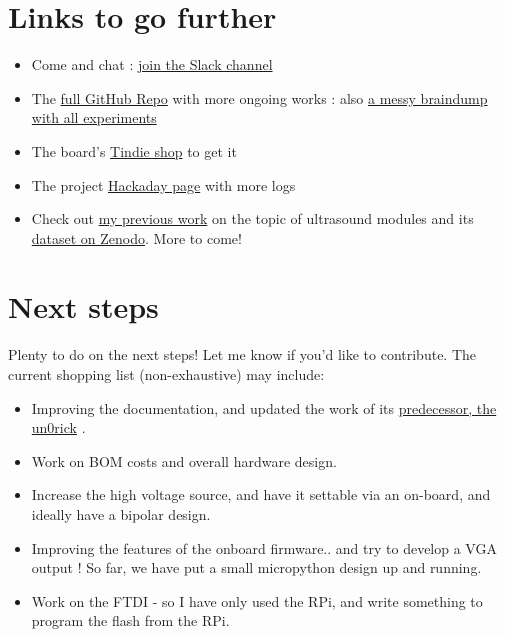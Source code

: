 \documentclass{article}
\begin{document}
\section{Links to go further}

\begin{itemize}
\item Come and chat : \href{https://join.slack.com/usdevkit/shared_invite/MTkxODU5MjU0NjI1LTE0OTY1ODgxMDEtMmYyZTliZDBlZA}{join the Slack channel} 
\item The \href{https://github.com/kelu124/lit3rick}{ full GitHub Repo} with more ongoing works : also \href{https://github.com/kelu124/echomods/}{a messy braindump with all experiments} 
\item The board’s \href{https://www.tindie.com/stores/kelu124/}{Tindie shop} to get it
\item The project \href{https://hackaday.io/project/28375-un0rick-an-ice40-ultrasound-board}{ Hackaday page} with more logs
\item Check out \href{https://openhardware.metajnl.com/articles/10.5334/joh.2/}{my previous work} on the topic of ultrasound modules \cite{kelu124} and its \href{http://doi.org/10.5281/zenodo.377054}{dataset on Zenodo}. More to come!

\end{itemize}

 \section{Next steps}

Plenty to do on the next steps! Let me know if you'd like to contribute. The current shopping list (non-exhaustive) may include:

\begin{itemize}
\item Improving the documentation, and updated the work of its \href{https://github.com/kelu124/un0rick}{predecessor, the un0rick} \cite{un0rick}.
\item Work on BOM costs and overall hardware design.
\item Increase the high voltage source, and have it settable via an on-board, and ideally have a bipolar design.  
\item Improving the features of the onboard firmware.. and try to develop a VGA output ! So far, we have put a small micropython design up and running.
\item Work on the FTDI - so I have only used the RPi, and write something to program the flash from the RPi. 
\end{itemize}
\end{document}
